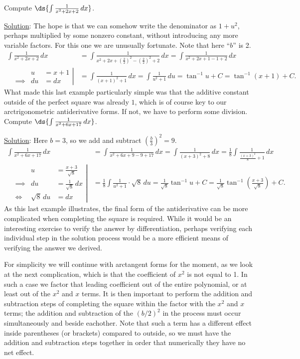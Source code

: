 \bex Compute $\ds{\int\frac1{x^2+2x+2}\,dx}$.

\underline{Solution}: The hope is that we can somehow write the
denominator as $1+u^2$, perhaps multiplied by some nonzero constant,
without introducing any more variable factors.  For this one we
are unusually fortunate. Note that here ``$b$'' is 2.
\begin{align*}
\int\frac1{x^2+2x+2}\,dx&
=\int\frac1{x^2+2x+\left(\frac22\right)^2-\left(\frac22\right)^2+2}\,dx
=\int\frac1{x^2+2x+1-1+2}\,dx\\
\left.\begin{alignedat}{2}
&&u&=x+1\\
&\implies&du&=dx
\end{alignedat}\right|
&=\int\frac1{(x+1)^2+1}\,dx
 =\int\frac1{u^2+1}\,du=\tan^{-1}u+C=\tan^{-1}(x+1)+C.
\end{align*}
\eex
What made this last example particularly simple was that the
additive constant outside of the perfect square was already $1$,
which is of course key to our arctrigonometric antiderivative forms.
If not, we have to perform some division.
\bex Compute $\ds{\int\frac1{x^2+6x+17}\,dx}$.

\underline{Solution}: Here $b=3$, so we add and subtract
$\left(\frac{b}3\right)^2=9$.
\begin{align*}
\int\frac1{x^2+6x+17}\,dx
&=\int\frac1{x^2+6x+9-9+17}\,dx=\int\frac1{(x+3)^2+8}\,dx
=\frac18\int\frac1{\frac{(x+3)^2}8+1}\,dx\\
\left.\begin{alignedat}{2}
&&u&=\frac{x+3}{\sqrt8}\\
&\implies&du&=\frac1{\sqrt8}\,dx\\
&\iff&\sqrt8\,du&=dx
\end{alignedat}\right|
&=\frac18\int\frac1{u^2+1}\cdot\sqrt8\,du
 =\frac1{\sqrt8}\tan^{-1}u+C
 =\frac1{\sqrt8}\tan^{-1}\left(\frac{x+3}{\sqrt8}\right)+C.
\end{align*}
\eex
As this last example illustrates, the final form of the antiderivative
can be more complicated when completing the square is required.  While it 
would be an interesting exercise to verify the answer by differentiation,
perhaps verifying each individual step in the solution process would
be a more efficient means of verifying the answer we derived.

For simplicity we will continue with arctangent forms for the moment,
as we look at the next complication, which is that the coefficient of 
$x^2$ is not equal to 1.  In such a case we factor that leading
coefficient out of the entire polynomial, or at least out of the
$x^2$ and $x$ terms.  It is then important to perform
the addition and subtraction steps of completing the square
within the factor with the $x^2$ and $x$ terms;  the addition
and subtraction of the $(b/2)^2$ in the process must occur
simultaneously and beside eachother.  Note that such a term
has a different effect inside parentheses (or brackets) compared
to outside, so we must have the addition and subtraction
steps together in order that numerically they have no net effect.

